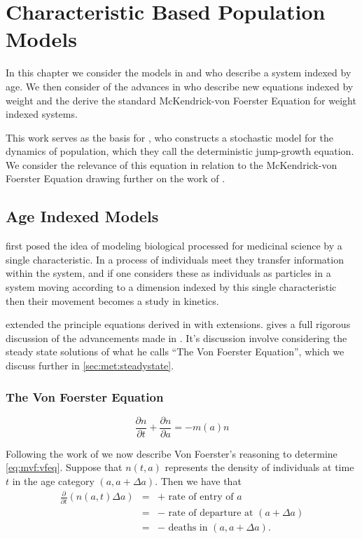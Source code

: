 \documentclass[../main.tex]{subfiles}
\begin{document}
  \chapter{Characteristic Based Population Models}\label{chapter:derivation}

  In this chapter we consider the models in \cite{mckendrick1926} and \cite{foerster1959} who describe a system indexed by age. We then consider of the advances in \cite{silvert1978} who describe new equations indexed by weight and the derive the standard McKendrick-von Foerster Equation for weight indexed systems.

  This work serves as the basis for \cite{datta2010}, who constructs a stochastic model for the dynamics of population, which they call the deterministic jump-growth equation. We consider the relevance of this equation in relation to the McKendrick-von Foerster Equation drawing further on the work of \cite{datta2010}.

  \section{Age Indexed Models}
  \cite{mckendrick1926} first posed the idea of modeling biological processed for medicinal science by a single characteristic. In a process of individuals meet they transfer information within the system, and if one considers these as individuals as particles in a system moving according to a dimension indexed by this single characteristic then their movement becomes a study in kinetics.

  \cite{foerster1959} extended the principle equations derived in \cite{mckendrick1926} with extensions. \cite{trucco1965} gives a full rigorous discussion of the advancements made in \cite{foerster1959}. It's discussion involve considering the steady state solutions of what he calls ``The Von Foerster Equation'', which we discuss further in \autoref{sec:met:steadystate}.

  \subsection{The Von Foerster Equation}
  \begin{equation}\label{eq:mvf:vfeq}
    \frac{\partial n}{\partial t} + \frac{\partial n}{\partial a} = - m(a)n
  \end{equation}

  Following the work of \cite{trucco1965} we now describe Von Foerster's reasoning to determine \autoref{eq:mvf:vfeq}. Suppose that $n(t, a)$ represents the density of individuals at time $t$ in the age category $(a, a + \Delta a)$. Then we have that
  \begin{eqnarray}\label{eq:mvf:derivword}
    \frac{\partial}{\partial t} \left( n(a, t) \Delta a \right)
    &=& + \mbox{ rate of entry of } a \nonumber \\
    &=& - \mbox{ rate of departure at } (a + \Delta a) \nonumber \\
    &=& - \mbox{ deaths in } (a, a + \Delta a).
  \end{eqnarray}
\end{document}
